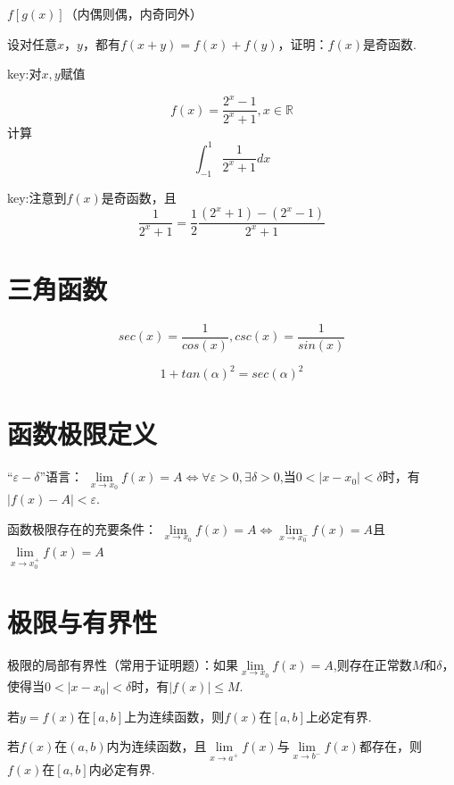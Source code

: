 \documentclass[12pt, a4paper, oneside]{ctexbook}
\begin{document}
$f[g(x)]$（内偶则偶，内奇同外）

\hspace*{\fill}

设对任意$x$，$y$，都有$f(x+y)=f(x)+f(y)$，证明：$f(x)$是奇函数.

key:对$x,y$赋值

\hspace*{\fill}

\[f(x)=\frac{2^x-1}{2^x+1},x\in \mathbb{R}\]
计算
\[\int_{-1}^{1}\frac{1}{2^x+1}dx\]

key:注意到$f(x)$是奇函数，且
\[\frac{1}{2^x+1}=\frac{1}{2}\frac{(2^x+1)-(2^x-1)}{2^x+1}\]

\section{三角函数}

\[sec(x)=\frac{1}{cos(x)},csc(x)=\frac{1}{sin(x)}\]

\[1+tan(\alpha)^2=sec(\alpha)^2\]

\section{函数极限定义}

“$\varepsilon - \delta$”语言：
$\lim\limits_{x \to x_0}f(x)=A \iff \forall \varepsilon >0,\exists \delta>0$,当$0<|x-x_0|<\delta$时，有$|f(x)-A|<\varepsilon$.

\hspace*{\fill}

函数极限存在的充要条件：
$\lim\limits_{x \to x_0}f(x)=A \iff \lim\limits_{x \to x_0^-}f(x)=A$且$\lim\limits_{x \to x_0^+}f(x)=A$

\section{极限与有界性}

极限的局部有界性（常用于证明题）：如果$\lim\limits_{x \to x_0}f(x)=A$,则存在正常数$M$和$\delta$，使得当$0<|x-x_0|<\delta$时，有$|f(x)|\leq M$.

\hspace*{\fill}

若$y=f(x)$在$[a,b]$上为连续函数，则$f(x)$在$[a,b]$上必定有界.

\hspace*{\fill}

若$f(x)$在$(a,b)$内为连续函数，且$\lim\limits_{x \to a^+}f(x)$与$\lim\limits_{x \to b^-}f(x)$都存在，则$f(x)$在$[a,b]$内必定有界.
\end{document}
